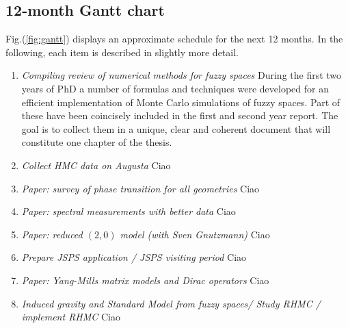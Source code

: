 \subsection{12-month Gantt chart}
Fig.(\ref{fig:gantt}) displays an approximate schedule for the next 12 months. In the following, each item is described in slightly more detail.
\begin{enumerate}
\item \textit{Compiling review of numerical methods for fuzzy spaces}\newline
During the first two years of PhD a number of formulas and techniques were developed for an efficient implementation of Monte Carlo simulations of fuzzy spaces. Part of these have been coincisely included in the first and second year report. The goal is to collect them in a unique, clear and coherent document that will constitute one chapter of the thesis.
\item \textit{Collect HMC data on Augusta}\newline
Ciao
\item \textit{Paper: survey of phase transition for all geometries}\newline
Ciao
\item \textit{Paper: spectral measurements with better data}\newline
Ciao
\item \textit{Paper: reduced $(2,0)$ model (with Sven Gnutzmann)}\newline
Ciao
\item \textit{Prepare JSPS application / JSPS visiting period}\newline
Ciao
\item \textit{Paper: Yang-Mills matrix models and Dirac operators}\newline
Ciao
\item \textit{Induced gravity and Standard Model from fuzzy spaces/ Study RHMC / implement RHMC}\newline
Ciao
\end{enumerate}

